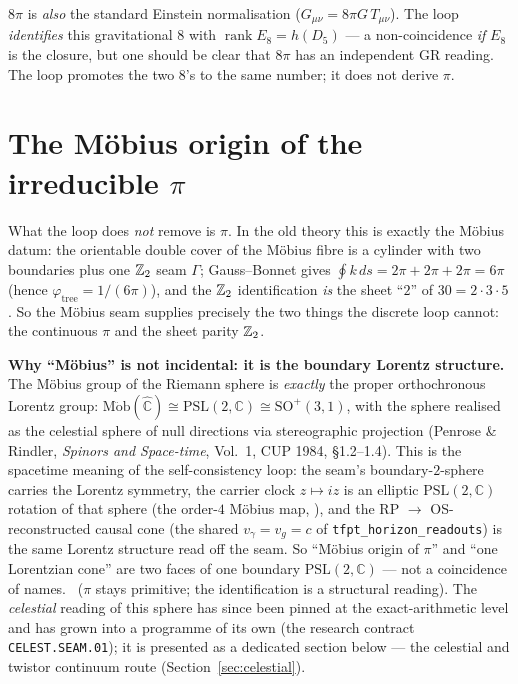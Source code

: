 \begin{gapbox}
$8\pi$ is \emph{also} the standard Einstein normalisation ($G_{\mu\nu}=8\pi G\,T_{\mu\nu}$). The loop
\emph{identifies} this gravitational $8$ with $\operatorname{rank}E_8=h(D_5)$ --- a non-coincidence
\emph{if} $E_8$ is the closure, but one should be clear that $8\pi$ has an independent GR reading. The
loop promotes the two $8$'s to the same number; it does not derive $\pi$.
\end{gapbox}

\section{The Möbius origin of the irreducible $\pi$}
What the loop does \emph{not} remove is $\pi$. In the old theory this is exactly the Möbius datum: the
orientable double cover of the Möbius fibre is a cylinder with two boundaries plus one $\mathbb{Z}_2$ seam
$\Gamma$; Gauss--Bonnet gives $\oint k\,ds=2\pi+2\pi+2\pi=6\pi$ (hence $\varphi_{\mathrm{tree}}=1/(6\pi)$),
and the $\mathbb{Z}_2$ identification \emph{is} the sheet ``$2$'' of $30=2\cdot3\cdot5$. So the Möbius seam
supplies precisely the two things the discrete loop cannot: the continuous $\pi$ and the sheet parity
$\mathbb{Z}_2$.

\par\smallskip\noindent\textbf{Why ``Möbius'' is not incidental: it is the boundary Lorentz structure.}
The Möbius group of the Riemann sphere is \emph{exactly} the proper orthochronous Lorentz group:
$\mathrm{M\ddot{o}b}(\hat{\mathbb C})\cong\mathrm{PSL}(2,\mathbb C)\cong\mathrm{SO}^+(3,1)$, with the sphere
realised as the celestial sphere of null directions via stereographic projection (Penrose \& Rindler,
\emph{Spinors and Space-time}, Vol.~1, CUP 1984, \S1.2--1.4). This is the spacetime meaning of the
self-consistency loop: the seam's boundary-$2$-sphere carries the Lorentz symmetry, the carrier clock
$z\mapsto iz$ is an elliptic $\mathrm{PSL}(2,\mathbb C)$ rotation of that sphere (the order-$4$ Möbius map,
), and the RP $\to$ OS-reconstructed causal cone (the shared
$v_\gamma=v_g=c$ of \texttt{tfpt\_horizon\_readouts}) is the same Lorentz structure read off the seam. So
``Möbius origin of $\pi$'' and ``one Lorentzian cone'' are two faces of one boundary $\mathrm{PSL}(2,\mathbb C)$
--- not a coincidence of names. \mO\ ($\pi$ stays primitive; the identification is a structural reading).
The \emph{celestial} reading of this sphere has since been pinned at the exact-arithmetic level and has
grown into a programme of its own (the research contract \texttt{CELEST.SEAM.01}); it is
presented as a dedicated section below --- the celestial and twistor continuum route
(Section~\ref{sec:celestial}).

